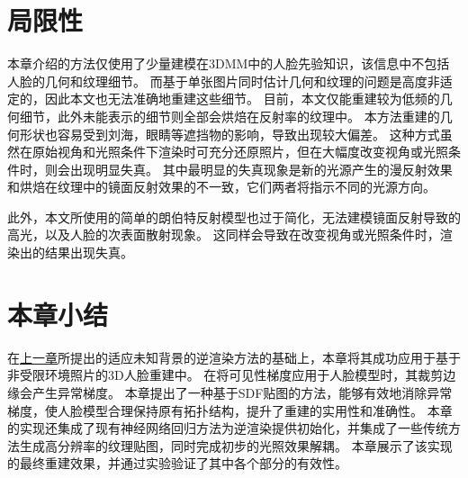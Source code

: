 \section{局限性}

本章介绍的方法仅使用了少量建模在3DMM中的人脸先验知识，该信息中不包括人脸的几何和纹理细节。
而基于单张图片同时估计几何和纹理的问题是高度非适定的，因此本文也无法准确地重建这些细节。
目前，本文仅能重建较为低频的几何细节，此外未能表示的细节则全部会烘焙在反射率的纹理中。
本方法重建的几何形状也容易受到刘海，眼睛等遮挡物的影响，导致出现较大偏差。
这种方式虽然在原始视角和光照条件下渲染时可充分还原照片，但在大幅度改变视角或光照条件时，则会出现明显失真。
其中最明显的失真现象是新的光源产生的漫反射效果和烘焙在纹理中的镜面反射效果的不一致，它们两者将指示不同的光源方向。

此外，本文所使用的简单的朗伯特反射模型也过于简化，无法建模镜面反射导致的高光，以及人脸的次表面散射现象。
这同样会导致在改变视角或光照条件时，渲染出的结果出现失真。

\section*{本章小结}

在\hyperref[chap:method]{上一章}所提出的适应未知背景的逆渲染方法的基础上，本章将其成功应用于基于非受限环境照片的3D人脸重建中。
在将可见性梯度应用于人脸模型时，其裁剪边缘会产生异常梯度。
本章提出了一种基于SDF贴图的方法，能够有效地消除异常梯度，使人脸模型合理保持原有拓扑结构，提升了重建的实用性和准确性。
本章的实现还集成了现有神经网络回归方法为逆渲染提供初始化，并集成了一些传统方法生成高分辨率的纹理贴图，同时完成初步的光照效果解耦。
本章展示了该实现的最终重建效果，并通过实验验证了其中各个部分的有效性。
